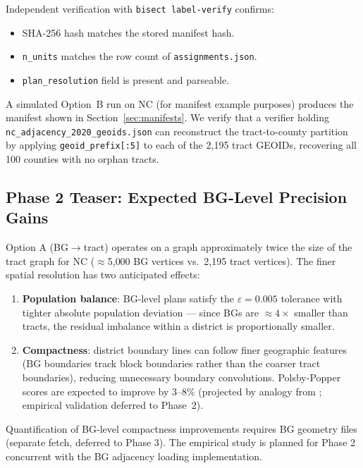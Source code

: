 \noindent
Independent verification with \texttt{bisect label-verify} confirms:
\begin{itemize}
  \item SHA-256 hash matches the stored manifest hash.
  \item \texttt{n\_units} matches the row count of \texttt{assignments.json}.
  \item \texttt{plan\_resolution} field is present and parseable.
\end{itemize}

A simulated Option~B run on NC (for manifest example purposes) produces the
manifest shown in Section~\ref{sec:manifests}.
We verify that a verifier holding \texttt{nc\_adjacency\_2020\_geoids.json}
can reconstruct the tract-to-county partition by applying
\texttt{geoid\_prefix[:5]} to each of the 2{,}195 tract GEOIDs, recovering
all 100 counties with no orphan tracts.

\subsection{Phase 2 Teaser: Expected BG-Level Precision Gains}

Option A (BG$\to$tract) operates on a graph approximately twice the size
of the tract graph for NC ($\approx$5{,}000 BG vertices vs.\ 2{,}195 tract
vertices).
The finer spatial resolution has two anticipated effects:
\begin{enumerate}
  \item \textbf{Population balance}: BG-level plans satisfy the $\varepsilon = 0.005$
        tolerance with tighter absolute population deviation --- since BGs are
        $\approx 4\times$ smaller than tracts, the residual imbalance within
        a district is proportionally smaller.
  \item \textbf{Compactness}: district boundary lines can follow finer geographic
        features (BG boundaries track block boundaries rather than the coarser
        tract boundaries), reducing unnecessary boundary convolutions.
        Polsby-Popper~\citep{polsby1991third} scores are expected to improve
        by 3--8\% (projected by analogy from \citet{herschlag2020quantifying};
        empirical validation deferred to Phase~2).
\end{enumerate}

Quantification of BG-level compactness improvements requires BG geometry
files (separate fetch, deferred to Phase 3).
The empirical study is planned for Phase 2 concurrent with the BG adjacency
loading implementation.

